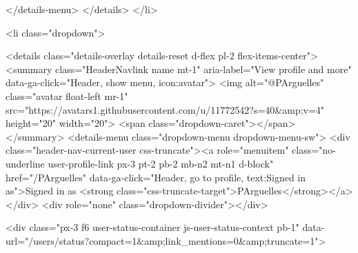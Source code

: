       </details-menu>
    </details>
  </li>

  <li class="dropdown">

    <details class="details-overlay details-reset d-flex pl-2 flex-items-center">
      <summary class="HeaderNavlink name mt-1"
        aria-label="View profile and more"
        data-ga-click="Header, show menu, icon:avatar">
        <img alt="@PArguelles" class="avatar float-left mr-1" src="https://avatars1.githubusercontent.com/u/11772542?s=40&amp;v=4" height="20" width="20">
        <span class="dropdown-caret"></span>
      </summary>
      <details-menu class="dropdown-menu dropdown-menu-sw">
        <div class="header-nav-current-user css-truncate"><a role="menuitem" class="no-underline user-profile-link px-3 pt-2 pb-2 mb-n2 mt-n1 d-block" href="/PArguelles" data-ga-click="Header, go to profile, text:Signed in as">Signed in as <strong class="css-truncate-target">PArguelles</strong></a></div>
        <div role="none" class="dropdown-divider"></div>

        <div class="px-3 f6 user-status-container js-user-status-context pb-1" data-url="/users/status?compact=1&amp;link_mentions=0&amp;truncate=1">
          
